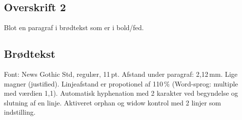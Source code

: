 \documentclass[danmark]{../UNF}
\begin{document}
\subsection{Overskrift 2}
Blot en paragraf i brødtekst som er i bold/fed.

\subsection{Brødtekst}
Font: News Gothic Std, regulær, 11\,pt. Afstand under paragraf: 2,12\,mm. Lige magner (justified). Linjeafstand er propotionel af 110\,\% (Word-sprog: multiple med værdien 1,1). Automatisk hyphenation med 2 karakter ved begyndelse og slutning af en linje. Aktiveret orphan og widow kontrol med 2 linjer som indstilling.
\end{document}
